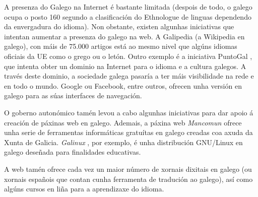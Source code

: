 \begin{multicols}{2}
    A presenza do Galego na Internet é bastante limitada (despois de todo, o galego ocupa o posto 160 segundo a clasificación do Ethnologue \cite{GAL-Nota16} de linguas dependendo da envergadura do idioma). Non obstante, existen algunhas iniciativas que intentan aumentar a presenza do galego na web. A Galipedia \cite{GAL-Nota17} (a Wikipedia en galego), con máis de 75.000 artigos está ao mesmo nivel que algúns idiomas oficiais da UE como o grego ou o letón. Outro exemplo é a iniciativa PuntoGal \cite{GAL-Nota18}, que intenta obter un dominio na Internet para o idioma e a cultura galegos. A través deste dominio, a sociedade galega pasaría a ter máis visibilidade na rede e en todo o mundo. Google ou Facebook, entre outros, ofrecen unha versión en galego para as súas interfaces de navegación.

O goberno autonómico tamén levou a cabo algunhas iniciativas para dar apoio á creación de páxinas web en galego. Ademais, a páxina web \textit{Mancomun} \cite{GAL-Nota19} ofrece unha serie de ferramentas informáticas gratuítas en galego creadas coa axuda da Xunta de Galicia. \textit{Galinux} \cite{GAL-Nota20}, por exemplo, é unha distribución GNU/Linux en galego deseñada para finalidades educativas.


A web tamén ofrece cada vez un maior número de xornais dixitais en galego (ou xornais españois que contan cunha ferramenta de tradución ao galego), así como algúns cursos en liña para a aprendizaxe do idioma. 

\end{multicols}

\clearpage



